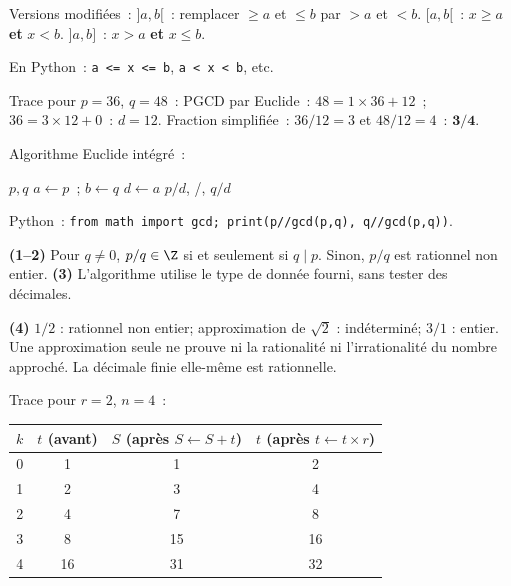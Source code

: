 Versions modifi\'ees~:
$]a,b[$~: remplacer $\geq a$ et $\leq b$ par $>a$ et $<b$.
$[a,b[$~: $x\geq a$ \textbf{et} $x<b$.
$]a,b]$~: $x>a$ \textbf{et} $x\leq b$.

En Python~: \texttt{a <= x <= b}, \texttt{a < x < b}, etc.


Trace pour $p=36$, $q=48$~:
PGCD par Euclide~: $48=1\times36+12$~; $36=3\times12+0$~: $d=12$.
Fraction simplifi\'ee~: $36/12=3$ et $48/12=4$~: $\mathbf{3/4}$.

Algorithme Euclide int\'egr\'e~:
\begin{algorithm}[H]
\caption{PGCD + simplification}
\Lire $p, q$\;
$a\leftarrow p$~; $b\leftarrow q$\;
$d\leftarrow a$\;
\Afficher $p/d$, \og/\fg, $q/d$\;
\end{algorithm}

Python~: \texttt{from math import gcd; print(p//gcd(p,q), q//gcd(p,q))}.


\textbf{(1--2)} Pour $q\ne0$, $p/q\in\Z$ si et seulement si $q\mid p$.
Sinon, $p/q$ est rationnel non entier.
\textbf{(3)} L'algorithme utilise le type de donn\'ee fourni, sans tester des d\'ecimales.
\begin{algorithm}[H]
\caption{Classifier selon une donn\'ee exacte ou approch\'ee}
\end{algorithm}
\textbf{(4)} $1/2$ : rationnel non entier; approximation de $\sqrt2$ :
ind\'etermin\'e; $3/1$ : entier.
Une approximation seule ne prouve ni la rationalit\'e ni l'irrationalit\'e
du nombre approch\'e. La d\'ecimale finie elle-m\^eme est rationnelle.


Trace pour $r=2$, $n=4$~:
\begin{center}
\renewcommand{\arraystretch}{1.2}
\begin{tabular}{cccc}
\toprule
$k$ & $t$ (avant) & $S$ (apr\`es $S\leftarrow S+t$) & $t$ (apr\`es $t\leftarrow t\times r$) \\
\midrule
0 & 1 & 1 & 2 \\
1 & 2 & 3 & 4 \\
2 & 4 & 7 & 8 \\
3 & 8 & 15 & 16 \\
4 & 16 & 31 & 32 \\
\bottomrule
\end{tabular}
\end{center}


